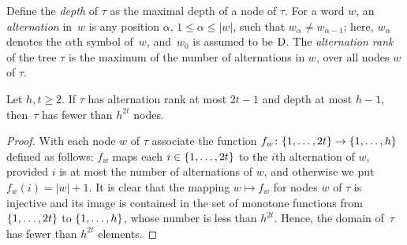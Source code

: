 Define the \emph{depth} of $\tau$ as the maximal depth of a node of
$\tau$.  For a word $w$, an \emph{alternation} in~$w$ is any position
$\alpha$, $1\leq \alpha\leq |w|$, such that
$w_\alpha\neq w_{\alpha-1}$; here, $w_\alpha$ denotes the $\alpha$th
symbol of~$w$, and~$w_0$ is assumed to be $\mathrm{D}$.  The
\emph{alternation rank} of the tree $\tau$ is the maximum of the
number of alternations in $w$, over all nodes $w$ of $\tau$.


\begin{lemma}\label{lem:number-of-nodes}
  Let $h,t\ge 2$. If $\tau$ has alternation rank at most $2t-1$ and
  depth at most $h-1$, then~$\tau$ has fewer than $h^{2t}$ nodes.
\end{lemma}
\begin{proof}		
  With each node $w$ of $\tau$ associate the function
  $f_w\colon \{1,\ldots,2t\}\to\{1,\ldots,h\}$ defined as follows:
  $f_w$ maps each $i\in \{1,\ldots,2t\}$ to the $i$th alternation of
  $w$, provided $i$ is at most the number of alternations of $w$, and
  otherwise we put $f_w(i)=|w|+1$.  It is clear that the mapping
  $w\mapsto f_w$ for nodes $w$ of $\tau$ is injective and its image is
  contained in the set of monotone functions from $\{1,\ldots,2t\}$
  to $\{1,\ldots,h\}$, whose number is less than $h^{2t}$.  Hence,
  the domain of~$\tau$ has fewer than $h^{2t}$ elements.
\end{proof}

